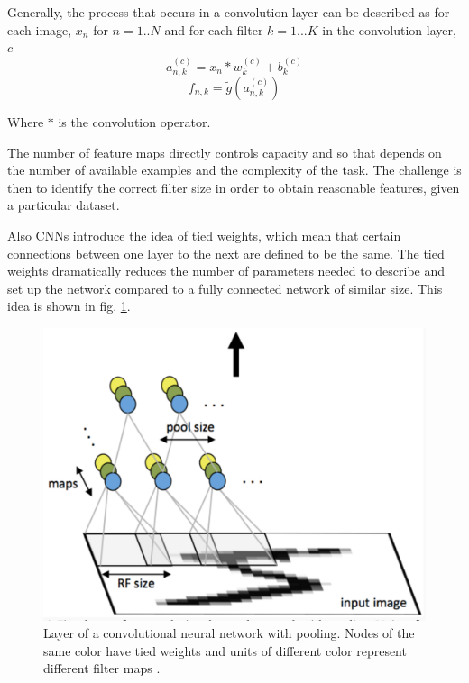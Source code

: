 \documentclass[12pt, twocolumn]{article}
\begin{document}
Generally, the process that occurs in a convolution layer can be described as for each image, $x_n$ for $n=1..N$ and for each filter $k=1...K$ in the convolution layer, $c$
\begin{equation}
a_{n,k}^{(c)}= x_n \ast w_k^{(c)} + b_k^{(c)}
\end{equation}
\begin{equation}
f_{n,k}= \tilde{g}(a_{n,k}^{(c)})
\end{equation}
 
 Where $\ast$ is the convolution operator. 
 
 The number of feature maps directly controls capacity and so that depends on the number of available examples and the complexity of the task. The challenge is then to identify the correct filter size in order to obtain reasonable features, given a particular dataset.

Also CNNs introduce the idea of tied weights, which mean that certain connections between one layer to the next are defined to be the same. The tied weights dramatically reduces the number of parameters needed to describe and set up the network compared to a fully connected network of similar size. This idea is shown in fig. \ref{fig:conv}.



\begin{figure}
\includegraphics[scale=.4]{convgraphic.png}

\caption{Layer of a convolutional neural network with pooling. Nodes of the same color have tied weights and units of different color represent different filter maps \cite{StanfordTut}. }
\label{fig:conv}
\end{figure}
\end{document}
